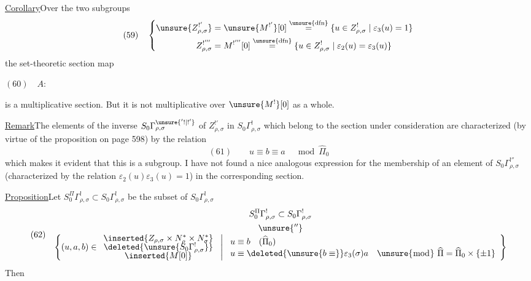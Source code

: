 \uline{Corollary}\quad Over the two subgroups
\[
(59)\quad\left\{\begin{aligned}
\unsure{Z_{\rho,\sigma}^{!'}}&=\unsure{M^{!'}}[0]
\overset{\unsure{\mathrm{dfn}}}{=}
\{u\in Z_{\rho,\sigma}^{!}\mid\varepsilon_3(u)=1\}\\
Z_{\rho,\sigma}^{!'''}&=M^{!'''}[0]
\overset{\unsure{\mathrm{dfn}}}{=}
\{u\in Z_{\rho,\sigma}^{!}\mid\varepsilon_2(u)=\varepsilon_3(u)\}
\end{aligned}\right.
\]
the set-theoretic section map

$(60)\quad A:$

is a multiplicative section. But it is not multiplicative
over $\unsure{M^{!}}[0]$ as a whole.

\uline{Remark}\quad The elements of the inverse 
$S_0\Gamma_{\rho,\sigma}^{\unsure{'!|!'}}$ of $Z_{\rho,\sigma}^{!'}$
in $S_0\Gamma_{\rho,\sigma}^{!}$ which belong to the section under consideration
are characterized (by virtue of the proposition on page 598) by the relation
\[
(61)\qquad u\equiv b\equiv a\quad\bmod\widehat\Pi_0
\]
which makes it evident that this is a subgroup.
I have not found a nice analogous expression for the membership of an
element of $S_0\Gamma_{\rho,\sigma}^{!''}$
(characterized by the relation $\varepsilon_2(u)\varepsilon_3(u)=1$)
in the corresponding section.

\uline{Proposition}\quad Let
$S_0^\Pi\Gamma_{\rho,\sigma}^{!}\subset S_0\Gamma_{\rho,\sigma}^{!}$
be the subset of $S_0\Gamma_{\rho,\sigma}^{!}$
\[
(62)\quad
\begin{gathered}
S_0^\Pi\Gamma_{\rho,\sigma}^{!}\subset S_0\Gamma_{\rho,\sigma}^{!}\\
\unsure{''}\\[-1ex]
\left\{(u,a,b)\in
\begin{array}{c}
\inserted{Z_{\rho,\sigma}\times N_\rho^*\times N_\sigma^*}\\[-.5ex]
\deleted{\unsure{S_0\Gamma_{\rho,\sigma}^{!}}}\\[-.5ex]
\inserted{M[0]}
\end{array}
\ \middle|\ 
\begin{array}{l}
u\equiv b\quad(\widehat\Pi_0)\\
u\equiv\deleted{\unsure{b\equiv}}\varepsilon_3(\sigma)a\quad
\unsure{\bmod}\ \widehat\Pi=\widehat\Pi_0\times\{\pm1\}
\end{array}
\right\}
\end{gathered}
\]
Then

